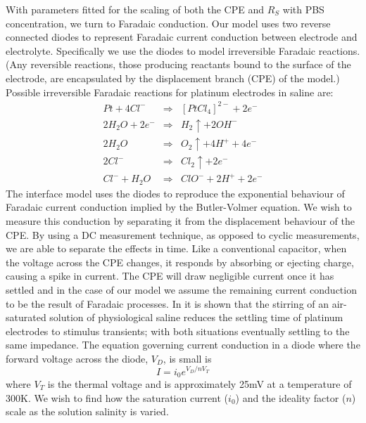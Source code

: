 \documentclass[journal, a4paper]{IEEEtran}
\begin{document}
With parameters fitted for the scaling of both the CPE and $R_{S}$ with PBS concentration, we turn to Faradaic conduction. 
{
    \color{blue}
    Our model uses two reverse connected diodes to represent Faradaic current conduction between electrode and electrolyte. Specifically we use the diodes to model irreversible Faradaic reactions. (Any reversible reactions, those producing reactants bound to the surface of the electrode, are encapsulated by the displacement branch (CPE) of the model.)
    Possible irreversible Faradaic reactions for platinum electrodes in saline are:
    \begin{eqnarray}
        Pt + 4Cl^{-} &\Rightarrow& [PtCl_{4}]^{2-} + 2 e^{-}\\
        2H_{2}O + 2 e^{-} &\Rightarrow& H_{2}\uparrow + 2OH^{-}\\
        2H_{2}O &\Rightarrow& O_{2}\uparrow + 4H^{+} + 4e^{-}\\
        2Cl^{-} &\Rightarrow& Cl_{2}\uparrow + 2e^{-}\\
        Cl^{-} + H_{2}O &\Rightarrow& ClO^{-} + 2H^{+} + 2e^{-}
    \end{eqnarray} 
}
The interface model uses the diodes to reproduce the exponential behaviour of Faradaic current conduction implied by the Butler-Volmer equation. We wish to measure this conduction by separating it from the displacement behaviour of the CPE. By using a DC measurement technique, as opposed to cyclic measurements, we are able to separate the effects in time. 
Like a conventional capacitor, when the voltage across the CPE changes, it responds by absorbing or ejecting charge, causing a spike in current. The CPE will draw negligible current once it has settled and in the case of our model we assume the remaining current conduction to be the result of Faradaic processes. 
{\color{blue} In \cite{Greatbatch1969} it is shown that the stirring of an air-saturated solution of physiological saline reduces the settling time of platinum electrodes to stimulus transients; with both situations eventually settling to the same impedance.}
The equation governing current conduction in a diode where the forward voltage across the diode, $V_{D}$, is small is
\begin{equation}
    I = i_{0}  e^{V_{D} / n V_{T}}
\end{equation}
where $V_{T}$ is the thermal voltage and is approximately 25\thinspace mV at a temperature of 300\thinspace K. We wish to find how the saturation current ($i_{0}$) and the ideality factor ($n$) scale as the solution salinity is varied.
\end{document}
